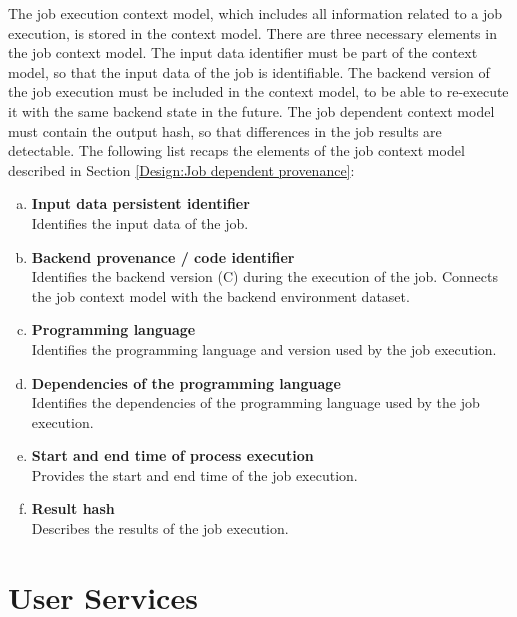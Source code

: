 \documentclass[draft,final]{vutinfth} %
\begin{document}
The job execution context model, which includes all information related to a job execution, is stored in the context model. There are three necessary elements in the job context model. The input data identifier must be part of the context model, so that the input data of the job is identifiable. The backend version of the job execution must be included in the context model, to be able to re-execute it with the same backend state in the future. The job dependent context model must contain the output hash, so that differences in the job results are detectable. The following list recaps the elements of the job context model described in Section \ref{Design:Job dependent provenance}: 

\begin{enumerate}[(a)]
	\item \textbf{Input data persistent identifier} \\
	Identifies the input data of the job.
	\item \textbf{Backend provenance / code identifier} \\
	Identifies the backend version (C) during the execution of the job. Connects the job context model with the backend environment dataset.
	\item \textbf{Programming language} \\
	Identifies the programming language and version used by the job execution.
	\item \textbf{Dependencies of the programming language} \\
	Identifies the dependencies of the programming language used by the job execution.
	\item \textbf{Start and end time of process execution} \\
	Provides the start and end time of the job execution.
	\item \textbf{Result hash} \\
	Describes the results of the job execution.
\end{enumerate}
\newpage
\section{User Services}\label{Design:User Interface}
\end{document}
